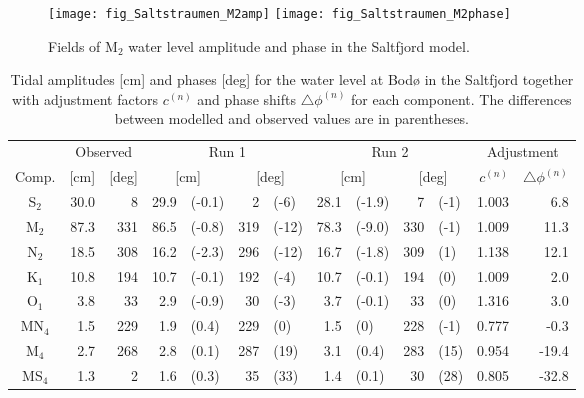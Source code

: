 \begin{figure}[!t]
\centering
\texttt{[image: fig\_Saltstraumen\_M2amp]}
\texttt{[image: fig\_Saltstraumen\_M2phase]}
\caption{Fields of M$_2$ water level amplitude and phase in the Saltfjord model.}
\label{fig:Saltstraumen_field}
\end{figure}

\begin{table}[ht]
\caption{Tidal amplitudes [cm] and phases [deg] for the water level at Bod{\o} in the Saltfjord together with adjustment factors $c^{(n)}$ and phase shifts $\triangle \phi^{(n)}$ for each component. The differences between modelled and observed values are in parentheses.}
\label{tab:Bodo}
\centering
\begin{tabular}{crrr@{ }lr@{ }lr@{ }lr@{ }lrr} \hline
      & \multicolumn{2}{c}{Observed} & \multicolumn{4}{c}{Run 1} & \multicolumn{4}{c}{Run 2} & \multicolumn{2}{c}{Adjustment} \\
Comp. & [cm] & [deg] & \multicolumn{2}{c}{[cm]} & \multicolumn{2}{c}{[deg]} & \multicolumn{2}{c}{[cm]} & \multicolumn{2}{c}{[deg]} & $c^{(n)}$ & $\triangle \phi^{(n)}$  \\ \hline 
S$_2$   &  30.0 &      8   &  29.9 & (-0.1) &    2 & (-6)   &  28.1 & (-1.9) &    7 & (-1)  &   1.003  &     6.8   \\ 
M$_2$   &  87.3 &    331   &  86.5 & (-0.8) &  319 & (-12)  &  78.3 & (-9.0) &  330 & (-1)  &   1.009  &    11.3   \\ 
N$_2$   &  18.5 &    308   &  16.2 & (-2.3) &  296 & (-12)  &  16.7 & (-1.8) &  309 & (1)   &   1.138  &    12.1   \\ 
K$_1$   &  10.8 &    194   &  10.7 & (-0.1) &  192 & (-4)   &  10.7 & (-0.1) &  194 & (0)   &   1.009  &     2.0   \\ 
O$_1$   &   3.8 &     33   &   2.9 & (-0.9) &   30 & (-3)   &   3.7 & (-0.1) &   33 & (0)   &   1.316  &     3.0   \\ 
MN$_4$  &   1.5 &    229   &   1.9 & (0.4)  &  229 & (0)    &   1.5 & (0)    &  228 & (-1)  &   0.777  &    -0.3   \\ 
M$_4$   &   2.7 &    268   &   2.8 & (0.1)  &  287 & (19)   &   3.1 & (0.4)  &  283 & (15)  &   0.954  &   -19.4   \\ 
MS$_4$  &   1.3 &      2   &   1.6 & (0.3)  &   35 & (33)   &   1.4 & (0.1)  &   30 & (28)  &   0.805  &   -32.8   \\ \hline
\end{tabular}
\end{table}


